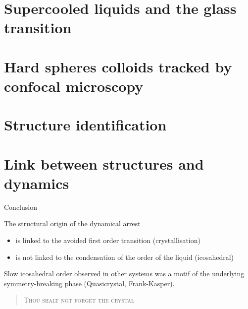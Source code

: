 \documentclass{beamer}
\begin{document}

\begin{frame}[plain]
\end{frame}



%

\section{Supercooled liquids and the glass transition}


\section{Hard spheres colloids tracked by confocal microscopy}


\section[Structure]{Structure identification}


\section[Link with dynamics]{Link between structures and dynamics}


\begin{frame}{Conclusion}
	\begin{block}{The structural origin of the dynamical arrest}
	\begin{itemize}
		\item is linked to the avoided first order transition (crystallisation)
		\item is not linked to the condensation of the order of the liquid (icosahedral)
	\end{itemize}
	\end{block}
	Slow icosahedral order observed in other systems was a motif of the underlying symmetry-breaking phase (Quasicrystal, Frank-Kasper).
	
	\bigskip
	
	\begin{verse}
	\textsc{Thou shalt not forget the crystal}
	\end{verse}

\end{frame}
\end{document}
